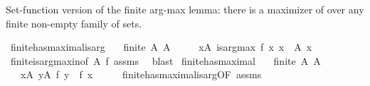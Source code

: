 \begin{isabellebody}
{}
\isamarkuptrue%
%
\endisatagdocument
{\isafolddocument}%
%
\isadelimdocument
%
\endisadelimdocument
%
\begin{isamarkuptext}%
Set-function version of the finite arg-max lemma: there is a maximizer
  of  over any finite non-empty family of sets.%
\end{isamarkuptext}\isamarkuptrue%
\isamarkupfalse%
\ finite{\isacharunderscore}{\kern0pt}has{\isacharunderscore}{\kern0pt}maximal{\isacharunderscore}{\kern0pt}is{\isacharunderscore}{\kern0pt}arg{\isacharcolon}{\kern0pt}\isanewline
\ \ \ {\isachardoublequoteopen}finite\ A{\isachardoublequoteclose}\ {\isachardoublequoteopen}A\ {\isasymnoteq}\ {\isacharbraceleft}{\kern0pt}{\isacharbraceright}{\kern0pt}{\isachardoublequoteclose}\isanewline
\ \ \ {\isachardoublequoteopen}{\isasymexists}x{\isasymin}A{\isachardot}{\kern0pt}\ is{\isacharunderscore}{\kern0pt}arg{\isacharunderscore}{\kern0pt}max\ f\ {\isacharparenleft}{\kern0pt}{\isasymlambda}x{\isachardot}{\kern0pt}\ x\ {\isasymin}\ A{\isacharparenright}{\kern0pt}\ x{\isachardoublequoteclose}\isanewline
%
\isadelimproof
\ \ %
\endisadelimproof
%
\isatagproof
{}\isamarkupfalse%
\ finite{\isacharunderscore}{\kern0pt}is{\isacharunderscore}{\kern0pt}arg{\isacharunderscore}{\kern0pt}max{\isacharunderscore}{\kern0pt}in{\isacharbrackleft}{\kern0pt}of\ A\ f{\isacharbrackright}{\kern0pt}\ assms\ \isamarkupfalse%
\ blast%
\endisatagproof
{\isafoldproof}%
%
\isadelimproof
\isanewline
%
\endisadelimproof
\isanewline
{}\isamarkupfalse%
\ finite{\isacharunderscore}{\kern0pt}has{\isacharunderscore}{\kern0pt}maximal{\isacharcolon}{\kern0pt}\isanewline
\ \ \ {\isachardoublequoteopen}finite\ A{\isachardoublequoteclose}\ {\isachardoublequoteopen}A\ {\isasymnoteq}\ {\isacharbraceleft}{\kern0pt}{\isacharbraceright}{\kern0pt}{\isachardoublequoteclose}\isanewline
\ \ \ {\isachardoublequoteopen}{\isasymexists}x{\isasymin}A{\isachardot}{\kern0pt}\ {\isasymforall}y{\isasymin}A{\isachardot}{\kern0pt}\ f\ y\ {\isasymle}\ f\ x{\isachardoublequoteclose}\isanewline
%
\isadelimproof
%
\endisadelimproof
%
\isatagproof
{}\isamarkupfalse%
\ {\isacharminus}{\kern0pt}\isanewline
\ \ \isamarkupfalse%
\ finite{\isacharunderscore}{\kern0pt}has{\isacharunderscore}{\kern0pt}maximal{\isacharunderscore}{\kern0pt}is{\isacharunderscore}{\kern0pt}arg{\isacharbrackleft}{\kern0pt}OF\ assms{\isacharbrackright}{\kern0pt}\isanewline

\end{isabellebody}
